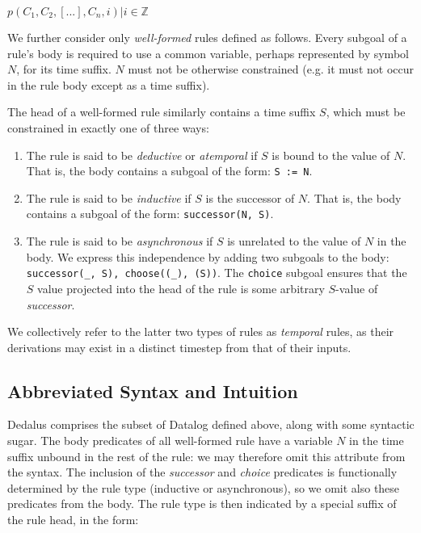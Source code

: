 \documentclass{acm_proc_article-sp-sigmod09}
\newcommand{\wrm}[1]{{\color{BurntOrange}{#1 -- wrm}}}
\newcommand{\dedalus}[1]{\texttt{\fontsize{9pt}{9pt}\selectfont #1}}
\begin{document}
$p(C_{1},C_{2},[...],C_{n}, i) |  i \in \mathbb{Z}$


We further consider only \emph{well-formed} rules defined as follows.  Every
subgoal of a rule's body is required to use a common variable, perhaps
represented by symbol $N$, for its time suffix.  $N$ must not be otherwise
constrained (e.g. it must not occur in the rule body except as a time suffix).


The head of a well-formed rule similarly contains a time suffix $S$, which must
be constrained in exactly one of three ways:

\begin{enumerate}

\item The rule is said to be \emph{deductive} or {\em atemporal} if $S$ is
bound to the value of $N$.  That is, the body contains a subgoal of the form:
\dedalus{S := N}.

\item The rule is said to be {\em inductive} if $S$ is the successor
of $N$.  That is, the body contains a subgoal of the form:
\dedalus{successor(N, S)}.

\item The rule is said to be {\em asynchronous} if $S$ is unrelated to the
value of $N$ in the body.  We express this independence by adding two subgoals
to the body: \dedalus{successor(\_, S), choose((\_), (S))}.  The
\dedalus{choice} subgoal ensures that the $S$ value projected into the head of
the rule is some arbitrary $S$-value of \emph{successor}. \wrm{Why can't we
select the initial time?  What we should do instead is have some unary relation
time(T) that captures all possible times, and choose from this relation
instead.  We can assume an inclusion constraint forcing successor's arguments
to both come from this relation.}

\end{enumerate}

We collectively refer to the latter two types of rules as {\em temporal} rules,
as their derivations may exist in a distinct timestep from that of their
inputs.

\subsection{Abbreviated Syntax and Intuition}

Dedalus comprises the subset of Datalog defined above, along with some syntactic sugar.  The body predicates of all well-formed rule have a 
variable $N$ in the time suffix unbound in the rest of the rule: we may therefore omit this attribute from the syntax.  The inclusion of the \emph{successor}
and \emph{choice} predicates is functionally determined by the rule type (inductive or asynchronous), so we omit also these predicates
from the body.  The rule type is then indicated by a special suffix of the rule head, in the form:
\end{document}
